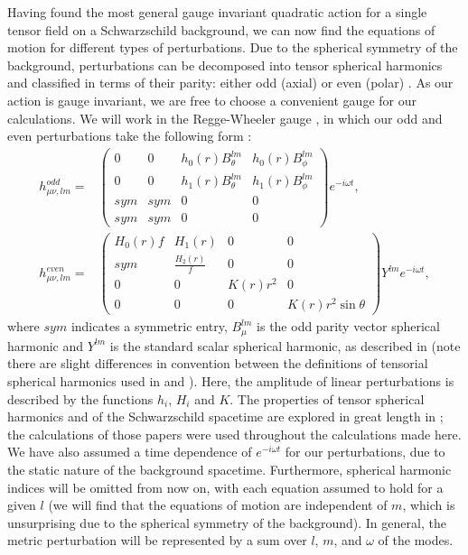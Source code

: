 \documentclass[10pt,twocolumn,preprintnumbers,amsmath,amssymb,nofootinbib
,superscriptaddress]{revtex4-1}
\begin{document}
Having found the most general gauge invariant quadratic action for a single tensor field on a Schwarzschild background, we can now find the equations of motion for different types of perturbations. Due to the spherical symmetry of the background, perturbations can be decomposed into tensor spherical harmonics and classified in terms of their parity: either odd (axial) or even (polar) \cite{Regge:1957td,Rezzolla:2003ua}. As our action is gauge invariant, we are free to choose a convenient gauge for our calculations. We will work in the Regge-Wheeler gauge \cite{Regge:1957td}, in which our odd and even perturbations take the following form \cite{Regge:1957td,Rezzolla:2003ua}:
 \begin{align}
 h_{\mu\nu,lm}^{odd}=&
 \begin{pmatrix}
 0&0&h_0(r)B^{lm}_\theta&h_0(r)B^{lm}_\phi\\
 0&0&h_1(r)B^{lm}_\theta&h_1(r)B^{lm}_\phi\\
 sym&sym&0&0\\
 sym&sym&0&0
 \end{pmatrix}e^{-i\omega t},
 \label{hodd}\\
 h_{\mu\nu,lm}^{even}=&
 \begin{pmatrix}
 H_0(r)f&H_1(r)&0&0\\
 sym&\frac{H_2(r)}{f}&0&0\\
 0&0&K(r)r^2&0\\
 0&0&0&K(r)r^2\sin\theta
 \end{pmatrix}Y^{lm}e^{-i\omega t},
 \label{heven}
\end{align}
where $sym$ indicates a symmetric entry, $B^{lm}_\mu$ is the odd parity vector spherical harmonic and $Y^{lm}$ is the standard scalar spherical harmonic, as described in \cite{Martel:2005ir,Ripley:2017kqg} (note there are slight differences in convention between the definitions of tensorial spherical harmonics used in \cite{Martel:2005ir} and \cite{Ripley:2017kqg}). Here, the amplitude of linear perturbations is described by the functions $h_i$, $H_i$ and $K$. The properties of tensor spherical harmonics and of the Schwarzschild spacetime are explored in great length in \cite{Martel:2005ir,Ripley:2017kqg}; the calculations of those papers were used throughout the calculations made here. We have also assumed a time dependence of $e^{-i\omega t}$ for our perturbations, due to the static nature of the background spacetime. Furthermore, spherical harmonic indices will be omitted from now on, with each equation assumed to hold for a given $l$ (we will find that the equations of motion are independent of $m$, which is unsurprising due to the spherical symmetry of the background). In general, the metric perturbation will be represented by a sum over $l$, $m$, and $\omega$ of the modes.
\end{document}
